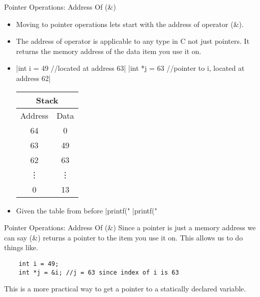 \documentclass[10pt]{beamer}
\begin{document}
\begin{frame}[fragile]{Pointer Operations: Address Of (\&)}
	\begin{itemize}[<+->]
	\item Moving to pointer operations lets start with the address of operator (\&).
	\item The address of operator is applicable to any type in C not just pointers. It returns the memory address of the data item you use it on.
	\item
	|int i = 49 //located at address 63|
	|int *j = 63 //pointer to i, located at address 62|
	\begin{tabular}{|c|c|}
		\hline
		\multicolumn{2}{|c|}{Stack}\\
		\hline
		Address & Data\\
		\hline
		64 &	0\\
		\hline
		63 &	49\\
		\hline
		62 &	63\\
		\hline
		\vdots & \vdots \\
		\hline
		0 & 13\\
		\hline
	\end{tabular}

	\item Given the table from before
	|printf("%
	|printf("%
	\end{itemize}
\end{frame}

\begin{frame}[fragile]{Pointer Operations: Address Of (\&)}
	Since a pointer is just a memory address we can say (\&) returns a pointer to the item you use it on. This allows us to do things like.
	\begin{verbatim}
	int i = 49;
	int *j = &i; //j = 63 since index of i is 63
	\end{verbatim}
	This is a more practical way to get a pointer to a statically declared variable.
\end{frame}
\end{document}
